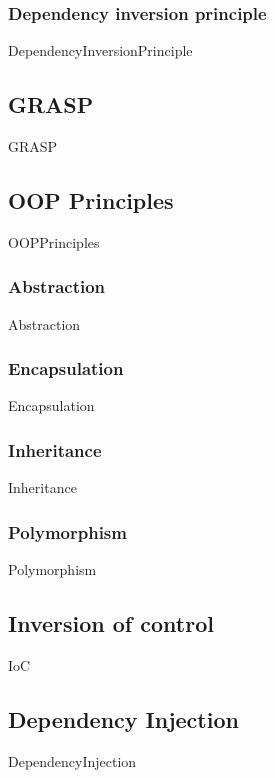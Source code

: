\documentclass{article}
\begin{document}
        \subsubsection{Dependency inversion principle}
            {DependencyInversionPrinciple}

    \subsection{GRASP}
        {GRASP}

    \subsection{OOP Principles}
        {OOPPrinciples}

        \subsubsection{Abstraction}
            {Abstraction}

        \subsubsection{Encapsulation}
            {Encapsulation}

        \subsubsection{Inheritance}
            {Inheritance}

        \subsubsection{Polymorphism}
            {Polymorphism}
    \subsection{Inversion of control}
        {IoC}
    \subsection{Dependency Injection}
        \label{DependencyInjection}
            {DependencyInjection}
\end{document}
